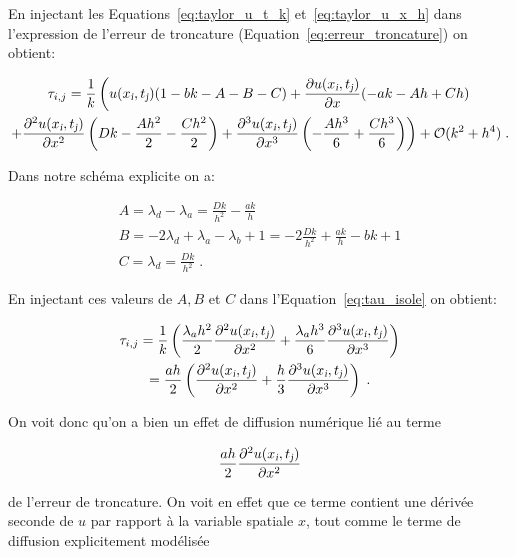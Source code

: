 \documentclass[a4paper, 12pt]{report}
\begin{document}
En injectant les Equations~\ref{eq:taylor_u_t_k} et~\ref{eq:taylor_u_x_h} dans
l'expression de l'erreur de troncature (Equation~\ref{eq:erreur_troncature}) on
obtient:

\begin{multline}
  \tau_{i,j} = \frac{1}{k} \left (u(x_{\textsl{i}},t_{\textsl{j}}) (1-bk-A-B-C) + \frac{\partial u(x_{\textsl{i}},t_{\textsl{j}})}{\partial x} (-ak -Ah + Ch) \right.\\
   \left. + \frac{\partial^2 u(x_{\textsl{i}},t_{\textsl{j}})}{\partial x^2} \left (Dk - \frac{A h^2}{2} - \frac{C h^2}{2} \right ) + \frac{\partial^3 u(x_{\textsl{i}},t_{\textsl{j}})}{\partial x^3} \left (-\frac{Ah^3}{6} + \frac{C h^3}{6} \right )  \right ) + \mathcal{O}(k^2+h^4)\;.
   \label{eq:tau_isole}
\end{multline}

Dans notre schéma explicite on a:

\begin{align}
  A = \lambda_d - \lambda_a = \frac{Dk}{h^2} - \frac{ak}{h}\\
  B = -2 \lambda_d + \lambda_a - \lambda_b +1 = -2 \frac{Dk}{h^2} + \frac{ak}{h} - bk +1\\
  C = \lambda_d = \frac{Dk}{h^2}\;.
\end{align}

En injectant ces valeurs de $A,B$ et $C$ dans l'Equation~\ref{eq:tau_isole} on obtient:

\begin{multline}
  \tau_{i,j} = \frac{1}{k} \left ( \frac{\lambda_a h^2}{2} \frac{\partial^2 u(x_{\textsl{i}},t_{\textsl{j}})}{\partial x^2} + \frac{\lambda_a h^3}{6} \frac{\partial^3 u(x_{\textsl{i}},t_{\textsl{j}})}{\partial x^3} \right)\\
  = \frac{a h}{2} \left ( \frac{\partial^2 u(x_{\textsl{i}},t_{\textsl{j}})}{\partial x^2} + \frac{h}{3} \frac{\partial^3 u(x_{\textsl{i}},t_{\textsl{j}})}{\partial x^3} \right ) \;.
\end{multline}

On voit donc qu'on a bien un effet de diffusion numérique lié au terme

\begin{equation}
  \frac{a h}{2} \frac{\partial^2 u(x_{\textsl{i}},t_{\textsl{j}})}{\partial x^2}
  \label{eq:terme_diffusion_numerique}
\end{equation}

de l'erreur de troncature. On voit en effet que ce terme contient une dérivée
seconde de $u$ par rapport à la variable spatiale $x$, tout comme le terme
de diffusion explicitement modélisée
\end{document}
